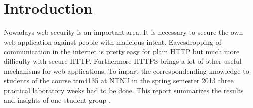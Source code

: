 \section {Introduction}
Nowadays web security is an important area. It is necessary to secure the own web application against people with malicious intent. Eavesdropping of communication in the internet is pretty easy for plain HTTP but much more difficulty with secure HTTP.  Furthermore HTTPS brings a lot of other useful mechanisms for web applications. 
To impart the correspondending knowledge to students of the course ttm4135 at NTNU in the spring semester 2013 three practical laboratory weeks had to be done. This report summarizes the results and insights of one student group .
